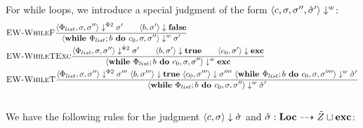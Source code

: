 For while loops, we introduce a special judgment of the form $\bigstepw{c}{\sigma, \sigma''}{\excstore'{}}$:
\begin{align*}
    &\bsrule{EW-WhileF}{\bigsteppr{\philist}{\store}{\store''}{\store'} \qquad
        \bigstep{b}{\store'}{\bfalse}}
    {\bigstepw{\defaultssawhile}{\store}{\store''}{\store'}}\\
    &\bsrule{EW-WhileTExc}{\bigsteppr{\philist}{\store}{\store''}{\store'} \qquad
        \bigstep{b}{\store'}{\btrue} \qquad 
    \bigstep{c_0}{\store'}{\exception}}
    {\bigstepw{\defaultssawhile}{\store}{\store''}{\exception}}\\
    &\bsrule{EW-WhileT}{\bigsteppr{\philist}{\store}{\store''}{\store'''} \ 
        \bigstep{b}{\store'''}{\btrue} \  
    \bigstep{c_0}{\store'''}{\store''''} \  
    \bigstepw{\defaultssawhile}{\store}{\store''''}{\excstore'}}
    {\bigstepw{\defaultssawhile}{\store}{\store''}{\excstore'}}\\
 \end{align*}
\\
We have the following rules for the judgment $\langle c, \sigma \rangle \downarrow \hat{\sigma}{}$
and $\hat{\sigma}{}: \textbf{Loc} \dashrightarrow \tilde{Z} \sqcup \textbf{exc}$:
